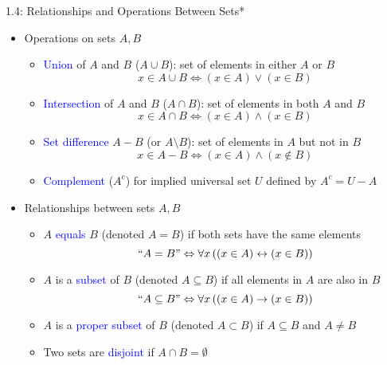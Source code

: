 \documentclass[10pt,english]{beamer}
\begin{document}
\begin{frame}{1.4: Relationships and Operations Between Sets*}

\begin{itemize}
\setlength\itemsep{3mm}
\item<1-> Operations on sets $A,B$ \vspace{1mm}
\begin{itemize} 
  \setlength\itemsep{1.5mm}
  \item \textcolor{blue}{Union} of $A$ and $B$ ($A\cup B$): set of elements in either $A$ or $B$
\[ x\in A\cup B \Leftrightarrow (x\in A)\vee (x\in B) \]
  \item \textcolor{blue}{Intersection} of $A$ and $B$ ($A\cap B$): set of elements in both $A$ and $B$
\[ x\in A\cap B \Leftrightarrow (x\in A)\wedge (x\in B) \]
  \item \textcolor{blue}{Set difference} $A-B$ (or $A \setminus \!B$): set of elements in $A$ but not in $B$
\[ x\in A-B \Leftrightarrow (x\in A)\wedge (x\notin B) \]
  \item \textcolor{blue}{Complement} ($A^c$) for implied universal set $U$  defined by $A^c = U-A$
\end{itemize}

\item<2-> Relationships between sets $A,B$ \vspace{1mm}
\begin{itemize} 
  \setlength\itemsep{1.5mm}
  \item $A$ \textcolor{blue}{equals} $B$ (denoted $A=B$) if both sets have the same elements
\[ ``A=B" \Leftrightarrow \forall x \left( (x\in A)\leftrightarrow (x\in B) \right) \]
  \item $A$ is a \textcolor{blue}{subset} of $B$ (denoted $A\subseteq B$) if all elements in $A$ are also in $B$
\[ ``A\subseteq B"  \Leftrightarrow \forall x \left( (x\in A)\rightarrow (x\in B) \right) \]
  \item $A$ is a \textcolor{blue}{proper subset} of $B$ (denoted $A\subset B$) if $A\subseteq B$ and $A\neq B$
  \item Two sets are \textcolor{blue}{disjoint} if $A\cap B = \emptyset$
\end{itemize}

\end{itemize}
\end{frame}
\end{document}
